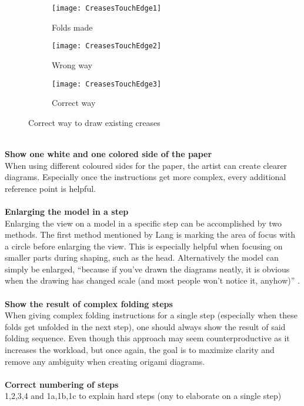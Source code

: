 \begin{figure*}[h]
    \centering
    \begin{subfigure}[b]{0.3\textwidth}
        \texttt{[image: CreasesTouchEdge1]}
        \caption{Folds made}
        \label{fig:creasesTouchEdge1}
    \end{subfigure}
    \begin{subfigure}[b]{0.3\textwidth}
        \texttt{[image: CreasesTouchEdge2]}
        \caption{Wrong way}
        \label{fig:creasesTouchEdge2}
    \end{subfigure}
    \begin{subfigure}[b]{0.3\textwidth}
        \texttt{[image: CreasesTouchEdge3]}
        \caption{Correct way}
        \label{fig:creasesTouchEdge3}
    \end{subfigure}
    \caption{Correct way to draw existing creases}\label{fig:creasesTouchEdge}
\end{figure*}
\\
\textbf{Show one white and one colored side of the paper}\\
When using different coloured sides for the paper, the artist can create clearer diagrams. Especially once the instructions get more complex, every additional reference point is helpful.\\
\\
\textbf{Enlarging the model in a step}\\
Enlarging the view on a model in a specific step can be accomplished by two methods. The first method mentioned by Lang is marking the area of focus with a circle before enlarging the view. This is especially helpful when focusing on smaller parts during shaping, such as the head. Alternatively the model can simply be enlarged, \enquote{because if you've drawn the diagrams neatly, it is obvious when the drawing has changed scale (and most people won't notice it, anyhow)} \cite{Lang}.\\
 \\
 \textbf{Show the result of complex folding steps}\\
When giving complex folding instructions for a single step (especially when these folds get unfolded in the next step), one should always show the result of said folding sequence. Even though this approach may seem counterproductive as it increases the workload, but once again, the goal is to maximize clarity and remove any ambiguity when creating origami diagrams.\\
\\
\textbf{Correct numbering of steps}\\
 1,2,3,4 and 1a,1b,1c to explain hard steps (ony to elaborate on a single step)\\

